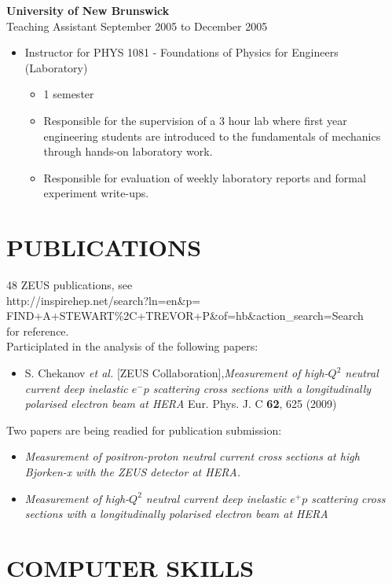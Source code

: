 \documentclass[margin]{res}
\begin{document}
\begin{resume}
{\bf University of New Brunswick} \\
Teaching Assistant \hfill September 2005 to December 2005 
\begin{itemize}
\item Instructor for PHYS 1081 - Foundations of Physics for Engineers (Laboratory)
  \begin{itemize}
    \item 1 semester
    \item Responsible for the supervision of a 3 hour lab where first year engineering students are introduced to the fundamentals of mechanics through hands-on laboratory work.
    \item Responsible for evaluation of weekly laboratory reports and formal experiment write-ups.
  \end{itemize}
\end{itemize}

\section{PUBLICATIONS}

48 ZEUS publications, see \\http://inspirehep.net/search?ln=en\&p=\\FIND+A+STEWART\%2C+TREVOR+P\&of=hb\&action\_search=Search\\
for reference.\\
Participlated in the analysis of the following papers:
\begin{itemize}
\item  S. Chekanov {\it et al.}  [ZEUS Collaboration],\textit{Measurement of high-$Q^2$ neutral current deep inelastic $e^- p$ scattering cross sections with a longitudinally polarised electron beam at HERA} Eur. Phys. J. C {\bf 62}, 625 (2009)
\end{itemize}

Two papers are being readied for publication submission:
\begin{itemize}
\item \textit{Measurement of positron-proton neutral current cross sections at high Bjorken-x with the ZEUS detector at HERA.}
\item \textit{Measurement of high-$Q^2$ neutral current deep inelastic $e^+ p$ scattering cross sections with a longitudinally polarised electron beam at HERA}
  
\end{itemize}

\section{COMPUTER SKILLS}


\end{resume}
\end{document}
